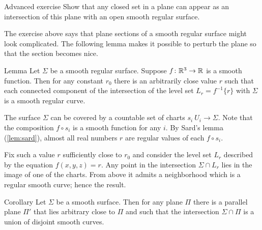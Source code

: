 \begin{thm}{Advanced exercise}\label{ex:plane-section}
Show that any closed set in a plane can appear as an intersection of this plane with an open smooth regular surface.  
\end{thm}

The exercise above says that plane sections of a smooth regular surface might look complicated.
The following lemma makes it possible to perturb the plane so that the section becomes nice.

\begin{thm}{Lemma}\label{lem:reg-section}
Let $\Sigma$ be a smooth regular surface.
Suppose $f\:\RR^3\z\to\RR$ is a smooth function.
Then for any constant $r_0$ there is an arbitrarily close value $r$ such that 
each connected component of the intersection of the level set $L_{r}=f^{-1}\{r\}$ with
$\Sigma$ is a smooth regular curve.
\end{thm}

The surface $\Sigma$ can be covered by a countable set of charts $s_i\:U_i\to \Sigma$.
Note that the composition $f\circ s_i$ is a smooth function for any $i$.
By Sard's lemma (\ref{lem:sard}), almost all real numbers $r$ are regular values of each $f\circ s_i$.

Fix such a value $r$ sufficiently close to $r_0$ and consider the level set $L_r$ described by the equation $f(x,y,z)=r$.
Any point in the intersection $\Sigma\cap L_r$ lies in the image of one of the charts.
From above it admits a neighborhood which is a regular smooth curve;
hence the result.\qeds

\begin{thm}{Corollary}
Let $\Sigma$ be a smooth surface.
Then for any plane $\Pi$ there is a parallel plane $\Pi'$ that lies arbitrary close to $\Pi$ and such that the intersection $\Sigma\cap\Pi$ is a union of disjoint smooth curves.
\end{thm}



